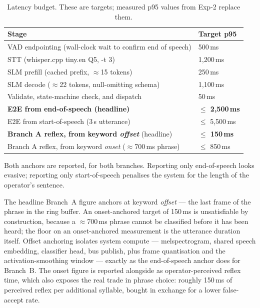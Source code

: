\documentclass[11pt,a4paper]{article}
\newcommand{\code}[1]{{\ttfamily\small #1}}
\newcommand{\munit}[1]{\,#1}
\begin{document}
\begin{table}[htbp]
\centering
\caption{Latency budget. These are targets; measured p95 values from Exp-2 replace them.}
\label{tab:latency}
\small
\begin{tabular}{@{}P{0.62}P{0.20}@{}}
\toprule
\textbf{Stage} & \textbf{Target p95} \\
\midrule
VAD endpointing (wall-clock wait to confirm end of speech)   & 500\munit{ms} \\
STT (\code{whisper.cpp tiny.en} Q5, \code{-t 3})             & 1{,}200\munit{ms} \\
SLM prefill (cached prefix, $\approx$15 tokens)              & 250\munit{ms} \\
SLM decode ($\approx$22 tokens, null-omitting schema)        & 1{,}100\munit{ms} \\
Validate, state-machine check, and dispatch                  & 50\munit{ms} \\
\midrule
\textbf{E2E from end-of-speech (headline)}                    & \textbf{$\leq$ 2{,}500\munit{ms}} \\
E2E from start-of-speech (3\munit{s} utterance)               & $\leq$ 5{,}500\munit{ms} \\
\textbf{Branch A reflex, from keyword \emph{offset}} (headline) & \textbf{$\leq$ 150\munit{ms}} \\
Branch A reflex, from keyword \emph{onset} ($\approx$700\munit{ms} phrase) & $\leq$ 850\munit{ms} \\
\bottomrule
\end{tabular}
\end{table}

Both anchors are reported, for both branches. Reporting only end-of-speech looks evasive; reporting only
start-of-speech penalises the system for the length of the operator's sentence.

The headline Branch~A figure anchors at keyword \emph{offset} --- the last frame of the phrase in the ring
buffer. An onset-anchored target of 150\munit{ms} is unsatisfiable by construction, because a
$\approx$700\munit{ms} phrase cannot be classified before it has been heard; the floor on an onset-anchored
measurement is the utterance duration itself. Offset anchoring isolates system compute --- melspectrogram,
shared speech embedding, classifier head, bus publish, plus frame quantisation and the activation-smoothing
window --- exactly as the end-of-speech anchor does for Branch~B. The onset figure is reported alongside as
operator-perceived reflex time, which also exposes the real trade in phrase choice: roughly
150\munit{ms} of perceived reflex per additional syllable, bought in exchange for a lower false-accept
rate.
\end{document}
